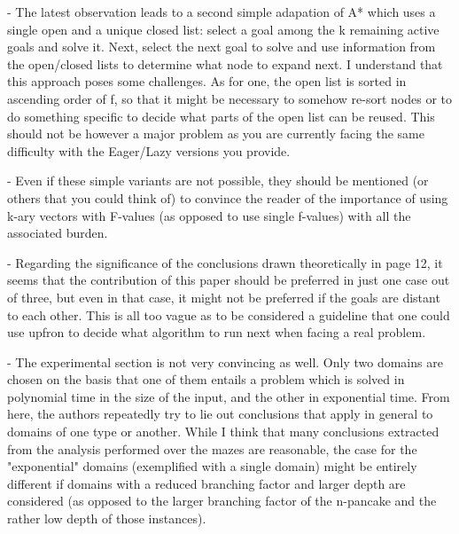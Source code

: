 - The latest observation leads to a second simple adapation of A*
  which uses a single open and a unique closed list: select a goal
  among the k remaining active goals and solve it. Next, select the
  next goal to solve and use information from the open/closed lists
to determine what node to expand next. I understand that this approach
  poses some challenges. As for one, the open list is sorted in
  ascending order of f, so that it might be necessary to somehow
  re-sort nodes or to do something specific to decide what parts of
  the open list can be reused. This should not be however a major
  problem as you are currently facing the same difficulty with the
  Eager/Lazy versions you provide.

-  Even if these simple variants are not possible, they should be
  mentioned (or others that you could think of) to convince the
reader of the importance of using k-ary vectors with F-values (as opposed
  to use single f-values) with all the associated burden. 

- Regarding the significance of the conclusions drawn theoretically
in   page 12, it seems that the contribution of this paper should be
  preferred in just one case out of three, but even in that case, it
  might not be preferred if the goals are distant to each other. This
  is all too vague as to be considered a guideline that one could use
  upfron to decide what algorithm to run next when facing a real
  problem.

 - The experimental section is not very convincing as
  well. Only two domains are chosen on the basis that one of them
  entails a problem which is solved in polynomial time in the size of
  the input, and the other in exponential time. From here, the
authors repeatedly try to lie out conclusions that apply in general to
  domains of one type or another. While I think that many conclusions
  extracted from the analysis performed over the mazes are
reasonable, the case for the "exponential" domains (exemplified with a
single domain) might be entirely different if domains with a reduced
  branching factor and larger depth are considered (as opposed to the
  larger branching factor of the n-pancake and the rather low depth
of those instances).
